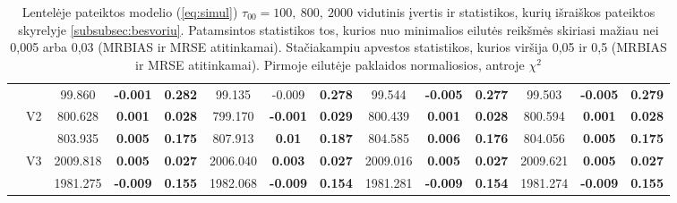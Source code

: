 \documentclass[11pt,a4paper]{article}
\begin{document}
{\begin{sidewaystable}[H]
{\begin{tabular}{cc|ccc|ccc|ccc|ccc|}
   &  & 99.860 & \textbf{-0.001} & \textbf{0.282} & 99.135 & -0.009 & \textbf{0.278} & 99.544 & \textbf{-0.005} & \textbf{0.277} & 99.503 & \textbf{-0.005} & \textbf{0.279} \\ 
   & \multirow{2}{*}{V2} & 800.628 & \textbf{0.001} & \textbf{0.028} & 799.170 & \textbf{-0.001} & \textbf{0.029} & 800.439 & \textbf{0.001} & \textbf{0.028} & 800.594 & \textbf{0.001} & \textbf{0.028} \\ 
   &  & 803.935 & \textbf{0.005} & \textbf{0.175} & 807.913 & \textbf{0.01} & \textbf{0.187} & 804.585 & \textbf{0.006} & \textbf{0.176} & 804.056 & \textbf{0.005} & \textbf{0.175} \\ 
   & \multirow{2}{*}{V3} & 2009.818 & \textbf{0.005} & \textbf{0.027} & 2006.040 & \textbf{0.003} & \textbf{0.027} & 2009.016 & \textbf{0.005} & \textbf{0.027} & 2009.621 & \textbf{0.005} & \textbf{0.027} \\ 
   &  & 1981.275 & \textbf{-0.009} & \textbf{0.155} & 1982.068 & \textbf{-0.009} & \textbf{0.154} & 1981.281 & \textbf{-0.009} & \textbf{0.154} & 1981.274 & \textbf{-0.009} & \textbf{0.155} \\ 
   \hline
\end{tabular}
}
\caption{Lentelėje pateiktos modelio (\ref{eq:simul}) $\tau_{00}=100,\ 800,\ 2000$ vidutinis įvertis ir statistikos, kurių išraiškos pateiktos skyrelyje \ref{subsubsec:besvoriu}. Patamsintos statistikos tos, kurios nuo minimalios eilutės reikšmės skiriasi mažiau nei 0,005 arba 0,03 (MRBIAS ir MRSE atitinkamai). Stačiakampiu apvestos statistikos, kurios viršija 0,05 ir 0,5 (MRBIAS ir MRSE atitinkamai). Pirmoje eilutėje paklaidos normaliosios, antroje $\chi^2$}
\end{sidewaystable}
}
\end{document}
